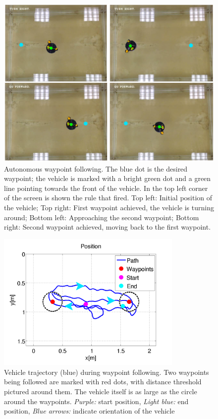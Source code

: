 \begin{figure}
\centering
\includegraphics[width=\textwidth]{Files/Figures/wp_example.png}
\caption[Autonomous waypoint following]{Autonomous waypoint following. The blue dot is the desired waypoint; the vehicle is marked with a bright green dot and a green line pointing towards the front of the vehicle. In the top left corner of the screen is shown the rule that fired. Top left: Initial position of the vehicle; Top right: First waypoint achieved, the vehicle is turning around; Bottom left: Approaching the second waypoint; Bottom right: Second waypoint achieved, moving back to the first waypoint.}
\label{fig-wp-follow}
\end{figure}

\begin{figure}
\centering
\includegraphics[width=0.8\textwidth]{Files/Figures/wp_2015-10-29_18-42-34-position.png}
\caption[Vehicle trajectory during waypoint following]{Vehicle trajectory (blue) during waypoint following. Two waypoints being followed are marked with red dots, with distance threshold pictured around them. The vehicle itself is as large as the circle around the waypoints. \textit{Purple:} start position, \textit{Light blue:} end position, \textit{Blue arrows:} indicate orientation of the vehicle }
\label{fig_wp_plot}
\end{figure}

